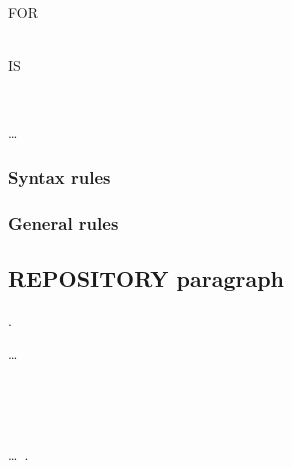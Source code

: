 \begin{syntax}
  \begin{0-1}
    FOR  \\
     \\
  \end{0-1}
   IS
  \begin{1=}
    \literal
    \begin{0-1}
      \begin{1=}
         \\
      \end{1=}
      \literal
    \end{0-1}
  \end{1=}\ldots

\end{syntax}

\subsubsection{Syntax rules}

\subsubsection{General rules}

\subsection{REPOSITORY paragraph}

\begin{syntax}
  .

  \begin{0-1}
    \begin{1=}
      \begin{1=}
        \begin{1=}
          \functionname
        \end{1=}\ldots \\

      \end{1=}
       \\

       \functionname
      \begin{0-1}
         \literal
      \end{0-1} \\

       \programname
      \begin{0-1}
         \literal
      \end{0-1}
    \end{1=}\ldots\ {}.
  \end{0-1}
\end{syntax}


